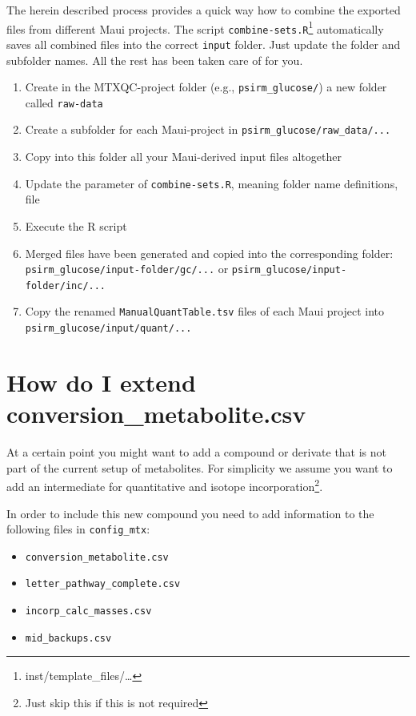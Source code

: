 \documentclass[]{book}
\providecommand{\tightlist}{%
  \setlength{\itemsep}{0pt}\setlength{\parskip}{0pt}}
\let\rmarkdownfootnote\footnote%
\def\footnote{\protect\rmarkdownfootnote}
\theoremstyle{definition}
\theoremstyle{definition}
\theoremstyle{definition}
\theoremstyle{remark}
\begin{document}
The herein described process provides a quick way how to combine the
exported files from different Maui projects. The script
\texttt{combine-sets.R}\footnote{inst/template\_files/\ldots{}}
automatically saves all combined files into the correct \texttt{input}
folder. Just update the folder and subfolder names. All the rest has
been taken care of for you.

\begin{enumerate}
\def\labelenumi{\arabic{enumi}.}
\tightlist
\item
  Create in the MTXQC-project folder (e.g., \texttt{psirm\_glucose/}) a
  new folder called \texttt{raw-data}
\item
  Create a subfolder for each Maui-project in
  \texttt{psirm\_glucose/raw\_data/...}
\item
  Copy into this folder all your Maui-derived input files altogether
\item
  Update the parameter of \texttt{combine-sets.R}, meaning folder name
  definitions, file
\item
  Execute the R script
\item
  Merged files have been generated and copied into the corresponding
  folder: \texttt{psirm\_glucose/input-folder/gc/...} or
  \texttt{psirm\_glucose/input-folder/inc/...}
\item
  Copy the renamed \texttt{ManualQuantTable.tsv} files of each Maui
  project into \texttt{psirm\_glucose/input/quant/...}
\end{enumerate}

\section{How do I extend conversion\_metabolite.csv}\label{extendconse}

At a certain point you might want to add a compound or derivate that is
not part of the current setup of metabolites. For simplicity we assume
you want to add an intermediate for quantitative and isotope
incorporation\footnote{Just skip this if this is not required}.

In order to include this new compound you need to add information to the
following files in \texttt{config\_mtx}:

\begin{itemize}
\tightlist
\item
  \texttt{conversion\_metabolite.csv}
\item
  \texttt{letter\_pathway\_complete.csv}
\item
  \texttt{incorp\_calc\_masses.csv}
\item
  \texttt{mid\_backups.csv}
\end{itemize}
\end{document}
